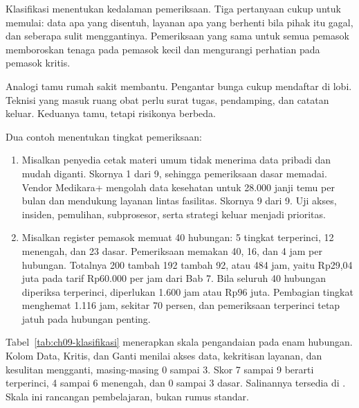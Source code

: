 Klasifikasi menentukan kedalaman pemeriksaan. Tiga pertanyaan cukup untuk memulai: data apa yang
disentuh, layanan apa yang berhenti bila pihak itu gagal, dan seberapa sulit menggantinya.
Pemeriksaan yang sama untuk semua pemasok memboroskan tenaga pada pemasok kecil dan mengurangi
perhatian pada pemasok kritis.

Analogi tamu rumah sakit membantu. Pengantar bunga cukup mendaftar di lobi. Teknisi yang masuk
ruang obat perlu surat tugas, pendamping, dan catatan keluar. Keduanya tamu, tetapi risikonya
berbeda.

Dua contoh menentukan tingkat pemeriksaan:
\begin{enumerate}
  \item Misalkan penyedia cetak materi umum tidak menerima data pribadi dan mudah diganti. Skornya
  1 dari 9, sehingga pemeriksaan dasar memadai. Vendor Medikara+ mengolah data kesehatan untuk
  28.000 janji temu per bulan dan mendukung layanan lintas fasilitas. Skornya 9 dari 9. Uji akses,
  insiden, pemulihan, subprosesor, serta strategi keluar menjadi prioritas.
  \item Misalkan register pemasok memuat 40 hubungan: 5 tingkat terperinci, 12 menengah, dan 23
  dasar. Pemeriksaan memakan 40, 16, dan 4 jam per hubungan. Totalnya 200 tambah 192 tambah 92,
  atau 484 jam, yaitu Rp29,04 juta pada tarif Rp60.000 per jam dari Bab 7. Bila seluruh 40
  hubungan diperiksa terperinci, diperlukan 1.600 jam atau Rp96 juta. Pembagian tingkat menghemat
  1.116 jam, sekitar 70 persen, dan pemeriksaan terperinci tetap jatuh pada hubungan penting.
\end{enumerate}

Tabel~\ref{tab:ch09-klasifikasi} menerapkan skala pengandaian pada enam hubungan. Kolom Data,
Kritis, dan Ganti menilai akses data, kekritisan layanan, dan kesulitan mengganti, masing-masing
0 sampai 3. Skor 7 sampai 9 berarti terperinci, 4 sampai 6 menengah, dan 0 sampai 3 dasar.
Salinannya tersedia di . Skala ini rancangan
pembelajaran, bukan rumus standar.

